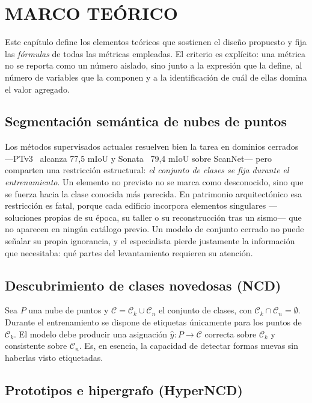 \chapter{MARCO TEÓRICO}
\label{cap:teorico}

Este capítulo define los elementos teóricos que sostienen el diseño propuesto y
fija las \emph{fórmulas} de todas las métricas empleadas. El criterio es
explícito: una métrica no se reporta como un número aislado, sino junto a la
expresión que la define, al número de variables que la componen y a la
identificación de cuál de ellas domina el valor agregado.

\section{Segmentación semántica de nubes de puntos}

Los métodos supervisados actuales resuelven bien la tarea en dominios cerrados
---PTv3~\cite{ptv3} alcanza 77,5 mIoU y Sonata~\cite{sonata} 79,4 mIoU sobre
ScanNet--- pero comparten una restricción estructural: \emph{el conjunto de
clases se fija durante el entrenamiento}. Un elemento no previsto no se marca
como desconocido, sino que se fuerza hacia la clase conocida más parecida. En
patrimonio arquitectónico esa restricción es fatal, porque cada edificio
incorpora elementos singulares ---soluciones propias de su época, su taller o su
reconstrucción tras un sismo--- que no aparecen en ningún catálogo previo. Un
modelo de conjunto cerrado no puede señalar su propia ignorancia, y el
especialista pierde justamente la información que necesitaba: qué partes del
levantamiento requieren su atención.

\section{Descubrimiento de clases novedosas (NCD)}

Sea $P$ una nube de puntos y $\mathcal{C}=\mathcal{C}_k\cup\mathcal{C}_n$ el
conjunto de clases, con $\mathcal{C}_k\cap\mathcal{C}_n=\emptyset$. Durante el
entrenamiento se dispone de etiquetas únicamente para los puntos de
$\mathcal{C}_k$. El modelo debe producir una asignación
$\hat{y}:P\rightarrow\mathcal{C}$ correcta sobre $\mathcal{C}_k$ y consistente
sobre $\mathcal{C}_n$. Es, en esencia, la capacidad de detectar formas nuevas sin
haberlas visto etiquetadas.

\section{Prototipos e hipergrafo (HyperNCD)}

